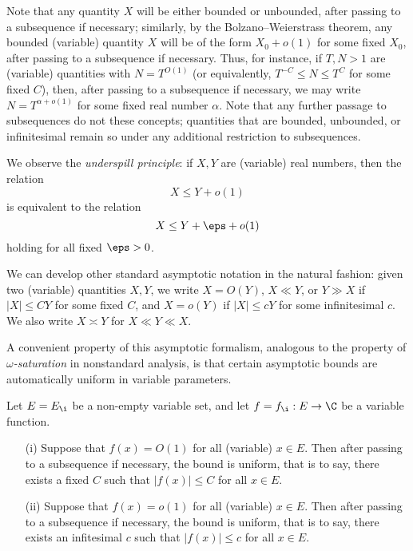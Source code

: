 Note that any quantity $X$ will be either bounded or unbounded, after passing to a subsequence if necessary; similarly, by the Bolzano--Weierstrass theorem, any bounded (variable) quantity $X$ will be of the form $X_0+o(1)$ for some fixed $X_0$, after passing to a subsequence if necessary.  Thus, for instance, if $T, N > 1$ are (variable) quantities with $N = T^{O(1)}$ (or equivalently, $T^{-C} \leq N \leq T^C$ for some fixed $C$), then, after passing to a subsequence if necessary, we may write $N = T^{\alpha+o(1)}$ for some fixed real number $\alpha$.  Note that any further passage to subsequences do not these concepts; quantities that are bounded, unbounded, or infinitesimal remain so under any additional restriction to subsequences.

We observe the \emph{underspill principle}: if $X,Y$ are (variable) real numbers, then the relation
$$ X \leq Y + o(1)$$
is equivalent to the relation
$$ X \leq Y + \eps + o(1)$$
holding for all fixed $\eps>0$.

We can develop other standard asymptotic notation in the natural fashion: given two (variable) quantities $X,Y$, we write $X = O(Y)$, $X \ll Y$, or $Y \gg X$ if $|X| \leq CY$ for some fixed $C$, and $X = o(Y)$ if $|X| \leq cY$ for some infinitesimal $c$.  We also write $X \asymp Y$ for $X \ll Y \ll X$.

A convenient property of this asymptotic formalism, analogous to the property of \emph{$\omega$-saturation} in nonstandard analysis, is that certain asymptotic bounds are automatically uniform in variable parameters.

\begin{proposition}\label{auto}  Let $E = E_{\i}$ be a non-empty variable set, and let $f = f_{\i}: E \to \C$ be a variable function.  \begin{itemize}
    \item[(i)] Suppose that $f(x)=O(1)$ for all (variable) $x \in E$.  Then after passing to a subsequence if necessary, the bound is uniform, that is to say, there exists a fixed $C$ such that $|f(x)| \leq C$ for all $x \in E$.
    \item[(ii)] Suppose that $f(x)=o(1)$ for all (variable) $x \in E$.  Then after passing to a subsequence if necessary, the bound is uniform, that is to say, there exists an infitesimal $c$ such that $|f(x)| \leq c$ for all $x \in E$.
\end{itemize}
\end{proposition}

